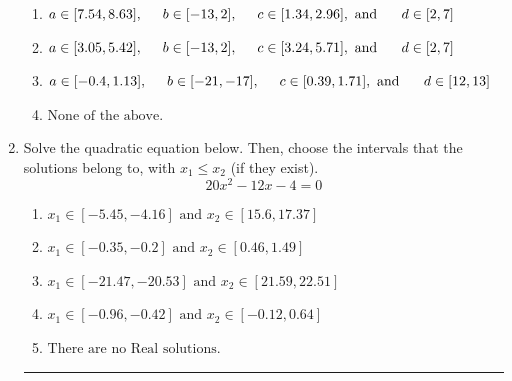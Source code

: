 \documentclass[14pt]{extbook}
\newcommand{\litem}[1]{\item#1\hspace*{-1cm}\rule{\textwidth}{0.4pt}}
\begin{document}
\begin{enumerate}
{\begin{enumerate}[label=\Alph*.]
\item \( a \in [7.54, 8.63], \hspace*{5mm} b \in [-13, 2], \hspace*{5mm} c \in [1.34, 2.96], \text{ and } \hspace*{5mm} d \in [2, 7] \)
\item \( a \in [3.05, 5.42], \hspace*{5mm} b \in [-13, 2], \hspace*{5mm} c \in [3.24, 5.71], \text{ and } \hspace*{5mm} d \in [2, 7] \)
\item \( a \in [-0.4, 1.13], \hspace*{5mm} b \in [-21, -17], \hspace*{5mm} c \in [0.39, 1.71], \text{ and } \hspace*{5mm} d \in [12, 13] \)
\item \( \text{None of the above.} \)

\end{enumerate} }
\litem{
Solve the quadratic equation below. Then, choose the intervals that the solutions belong to, with $x_1 \leq x_2$ (if they exist).\[ 20x^{2} -12 x -4 = 0 \]\begin{enumerate}[label=\Alph*.]
\item \( x_1 \in [-5.45, -4.16] \text{ and } x_2 \in [15.6, 17.37] \)
\item \( x_1 \in [-0.35, -0.2] \text{ and } x_2 \in [0.46, 1.49] \)
\item \( x_1 \in [-21.47, -20.53] \text{ and } x_2 \in [21.59, 22.51] \)
\item \( x_1 \in [-0.96, -0.42] \text{ and } x_2 \in [-0.12, 0.64] \)
\item \( \text{There are no Real solutions.} \)


\end{enumerate}}
\end{enumerate}
\end{document}
